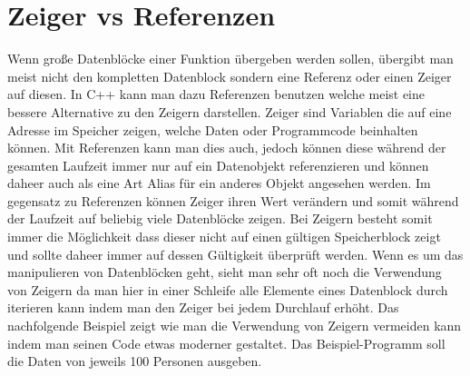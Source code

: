 \documentclass[MES,Master,ngerman]{twbook}%
\begin{document}
\section{Zeiger vs Referenzen}
Wenn große Datenblöcke einer Funktion übergeben werden sollen, übergibt man meist nicht den kompletten Datenblock sondern eine Referenz oder einen Zeiger auf diesen. In C++ kann man dazu Referenzen benutzen welche meist eine bessere Alternative zu den Zeigern darstellen. Zeiger sind Variablen die auf eine Adresse im Speicher zeigen, welche Daten oder Programmcode beinhalten können. Mit Referenzen kann man dies auch, jedoch können diese während der gesamten Laufzeit immer nur auf ein Datenobjekt referenzieren und können daheer auch als eine Art Alias für ein anderes Objekt angesehen werden. Im gegensatz zu Referenzen können Zeiger ihren Wert verändern und somit während der Laufzeit auf beliebig viele Datenblöcke zeigen. Bei Zeigern besteht somit immer die Möglichkeit dass dieser nicht auf einen gültigen Speicherblock zeigt und sollte daheer immer auf dessen Gültigkeit überprüft werden. \newline \newline
Wenn es um das manipulieren von Datenblöcken geht, sieht man sehr oft noch die Verwendung von Zeigern da man hier in einer Schleife alle Elemente eines Datenblock durch iterieren kann indem man den Zeiger bei jedem Durchlauf erhöht. Das nachfolgende Beispiel zeigt wie man die Verwendung von Zeigern vermeiden kann indem man seinen Code etwas moderner gestaltet. Das Beispiel-Programm soll die Daten von jeweils 100 Personen ausgeben.\newline

\begin{figure}[!htb]
	\begin{subfigure}[b]{0.5\textwidth}
		
		\label{fig:13}
	\end{subfigure}
	\begin{subfigure}[b]{0.5\textwidth}
		
		\label{fig:14}
	\end{subfigure}
\end{figure}
\end{document}
